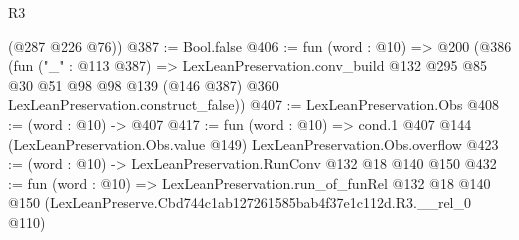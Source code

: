 \begin{lexlean}{R3}
\begin{coremodule}
      (@287 @226 @76))
@387 := Bool.false
@406 := fun (word : @10) =>
  @200
    (@386
      (fun ("_" : @113 @387) =>
      LexLeanPreservation.conv_build
        @132
        @295
        @85
        @30
        @51
        @98
        @98
        @139
        (@146 @387)
        @360
        LexLeanPreservation.construct_false))
@407 := LexLeanPreservation.Obs
@408 := (word : @10) -> @407
@417 := fun (word : @10) =>
  cond.{1} @407 @144 (LexLeanPreservation.Obs.value @149) LexLeanPreservation.Obs.overflow
@423 := (word : @10) -> LexLeanPreservation.RunConv @132 @18 @140 @150
@432 := fun (word : @10) =>
  LexLeanPreservation.run_of_funRel
    @132
    @18
    @140
    @150
    (LexLeanPreserve.Cbd744c1ab127261585bab4f37e1c112d.R3.__rel_0 @110)
\end{coremodule}
\end{lexlean}
